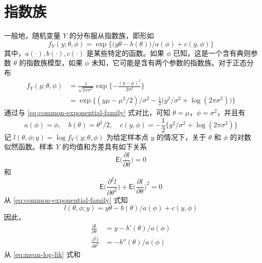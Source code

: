 \documentclass[12pt,a4paper,UTF8,twoside]{book}
\theoremstyle{definition}
\theoremstyle{definition}
\theoremstyle{definition}
\theoremstyle{remark}
\begin{document}
\hypertarget{sec:exp}{%
\section{指数族}\label{sec:exp}}

一般地，随机变量 \(Y\) 的分布服从指数族，即形如 \begin{equation}
f_{Y}(y;\theta,\phi) = \exp\big\{ \big(y\theta - b(\theta) \big)/a(\phi) + c(y,\phi) \big\}
\label{eq:common-exponential-family}
\end{equation} \noindent 其中，\(a(\cdot),b(\cdot),c(\cdot)\)
是某些特定的函数。如果 \(\phi\) 已知，这是一个含有典则参数 \(\theta\)
的指数族模型，如果 \(\phi\)
未知，它可能是含有两个参数的指数族。对于正态分布 \begin{equation}
\begin{aligned}
f_{Y}(y;\theta,\phi) & = \frac{1}{\sqrt{2\pi\sigma^2}} \exp\{-\frac{(y - \mu)^2}{2\sigma^2}  \}  \\
 & = \exp\big \{ (y\mu - \mu^2/2)/\sigma^2 - \frac{1}{2}\big(y^2/\sigma^2 + \log(2\pi\sigma^2)\big) \big\}
\end{aligned} \label{eq:normal-distribution}
\end{equation} \noindent 通过与 \eqref{eq:common-exponential-family}
式对比，可知 \(\theta = \mu\)，\(\phi = \sigma^2\)，并且有 \[
a(\phi) = \phi, \quad b(\theta) = \theta^2/2, \quad c(y,\phi) = - \frac{1}{2}\{ y^2/\sigma^2 + \log(2\pi\sigma^2) \} 
\] \noindent 记 \(l(\theta,\phi;y) = \log f_{Y}(y;\theta,\phi)\)
为给定样本点 \(y\) 的情况下，关于 \(\theta\) 和 \(\phi\)
的对数似然函数。样本 \(Y\) 的均值和方差具有如下关系
\citep{McCullagh1989} \begin{equation}
\mathsf{E}\big( \frac{\partial l}{\partial \theta} \big) = 0
\label{eq:mean-log-lik}
\end{equation} \noindent 和 \begin{equation}
\mathsf{E}\big( \frac{\partial^2 l}{\partial \theta^2} \big) + \mathsf{E}\big(\frac{\partial l}{\partial \theta}\big)^2  = 0
\label{eq:variance-log-lik}
\end{equation} \noindent 从 \eqref{eq:common-exponential-family} 式知
\[ l(\theta,\phi;y) = {y\theta - b(\theta)}/a(\phi) + c(y,\phi) \]
\noindent 因此， \begin{equation}
\begin{aligned}
\frac{\partial l}{\partial \theta} & = {y - b'(\theta)}/a(\phi)  \\
\frac{\partial^2 l}{\partial \theta^2}  & = - b''(\theta)/a(\phi)
\end{aligned} \label{eq:partial-log-lik}
\end{equation} \noindent 从 \eqref{eq:mean-log-lik} 式和
\end{document}
